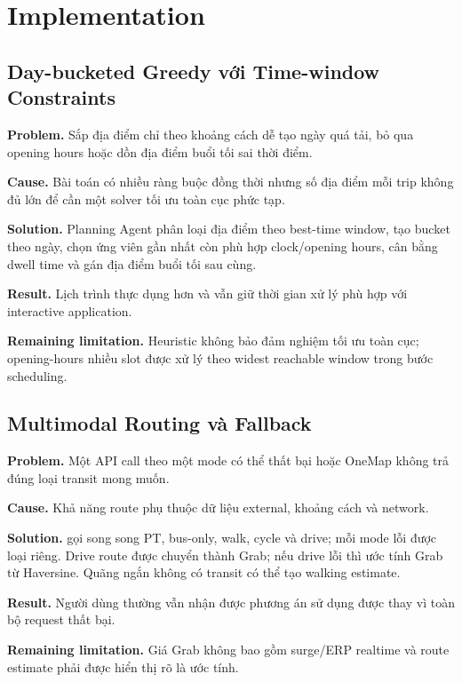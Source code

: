 \chapter{Implementation}

\section{Day-bucketed Greedy với Time-window Constraints}

\textbf{Problem.} Sắp địa điểm chỉ theo khoảng cách dễ tạo ngày quá tải, bỏ qua opening hours hoặc dồn địa điểm buổi tối sai thời điểm.

\textbf{Cause.} Bài toán có nhiều ràng buộc đồng thời nhưng số địa điểm mỗi trip không đủ lớn để cần một solver tối ưu toàn cục phức tạp.

\textbf{Solution.} Planning Agent phân loại địa điểm theo best-time window, tạo bucket theo ngày, chọn ứng viên gần nhất còn phù hợp clock/opening hours, cân bằng dwell time và gán địa điểm buổi tối sau cùng.

\textbf{Result.} Lịch trình thực dụng hơn và vẫn giữ thời gian xử lý phù hợp với interactive application.

\textbf{Remaining limitation.} Heuristic không bảo đảm nghiệm tối ưu toàn cục; opening-hours nhiều slot được xử lý theo widest reachable window trong bước scheduling.

\section{Multimodal Routing và Fallback}

\textbf{Problem.} Một API call theo một mode có thể thất bại hoặc OneMap không trả đúng loại transit mong muốn.

\textbf{Cause.} Khả năng route phụ thuộc dữ liệu external, khoảng cách và network.

\textbf{Solution.}  gọi song song PT, bus-only, walk, cycle và drive; mỗi mode lỗi được loại riêng. Drive route được chuyển thành Grab; nếu drive lỗi thì ước tính Grab từ Haversine. Quãng ngắn không có transit có thể tạo walking estimate.

\textbf{Result.} Người dùng thường vẫn nhận được phương án sử dụng được thay vì toàn bộ request thất bại.

\textbf{Remaining limitation.} Giá Grab không bao gồm surge/ERP realtime và route estimate phải được hiển thị rõ là ước tính.

